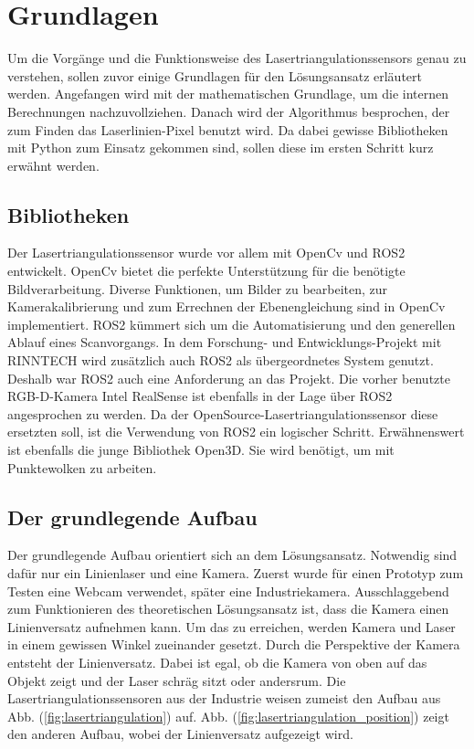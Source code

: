 \section{Grundlagen}\label{grundlagen}
	Um die Vorgänge und die Funktionsweise des Lasertriangulationssensors genau zu verstehen, sollen zuvor einige Grundlagen für den Lösungsansatz erläutert werden. Angefangen wird mit der mathematischen Grundlage, um die internen Berechnungen nachzuvollziehen. Danach wird der Algorithmus besprochen, der zum Finden das Laserlinien-Pixel benutzt wird. Da dabei gewisse Bibliotheken mit Python zum Einsatz gekommen sind, sollen diese im ersten Schritt kurz erwähnt werden.
	
	\subsection{Bibliotheken}
	Der Lasertriangulationssensor wurde vor allem mit OpenCv und ROS2 entwickelt. OpenCv bietet die perfekte Unterstützung für die benötigte Bildverarbeitung. Diverse Funktionen, um Bilder zu bearbeiten, zur Kamerakalibrierung und zum Errechnen der Ebenengleichung sind in OpenCv implementiert. \newline
	ROS2 kümmert sich um die Automatisierung und den generellen Ablauf eines Scanvorgangs. In dem Forschung- und Entwicklungs-Projekt mit RINNTECH wird zusätzlich auch ROS2 als übergeordnetes System genutzt. Deshalb war ROS2 auch eine Anforderung an das Projekt. Die vorher benutzte RGB-D-Kamera Intel RealSense ist ebenfalls in der Lage über ROS2 angesprochen zu werden. Da der OpenSource-Lasertriangulationssensor diese ersetzten soll, ist die Verwendung von ROS2 ein logischer Schritt. \newline
	Erwähnenswert  ist ebenfalls die junge Bibliothek Open3D. Sie wird benötigt, um mit Punktewolken zu arbeiten.
	
	\subsection{Der grundlegende Aufbau}
	Der grundlegende Aufbau orientiert sich an dem Lösungsansatz. Notwendig sind dafür nur ein Linienlaser und eine Kamera. Zuerst wurde für einen Prototyp zum Testen eine Webcam verwendet, später eine Industriekamera. Ausschlaggebend zum Funktionieren des theoretischen Lösungsansatz ist, dass die Kamera einen Linienversatz aufnehmen kann. Um das zu erreichen, werden Kamera und Laser in einem gewissen Winkel zueinander gesetzt. Durch die Perspektive der Kamera entsteht der Linienversatz. Dabei ist egal, ob die Kamera von oben auf das Objekt zeigt und der Laser schräg sitzt oder andersrum. Die Lasertriangulationssensoren aus der Industrie weisen zumeist den Aufbau aus Abb. (\ref{fig:lasertriangulation}) auf. Abb. (\ref{fig:lasertriangulation_position}) zeigt den anderen Aufbau, wobei der Linienversatz aufgezeigt wird.
	
